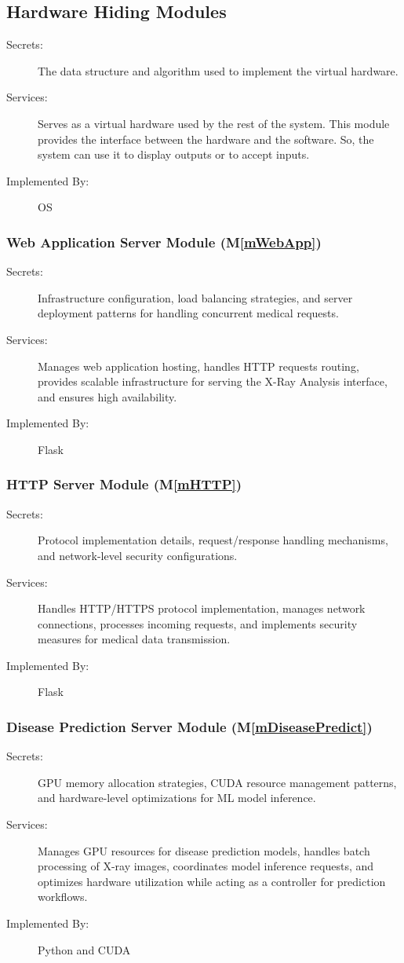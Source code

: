\documentclass[12pt, titlepage]{article}
\newcommand{\mref}[1]{M\ref{#1}}
\begin{document}
\subsection{Hardware Hiding Modules}

\begin{description}
\item[Secrets:]The data structure and algorithm used to implement the virtual
  hardware.
\item[Services:]Serves as a virtual hardware used by the rest of the
  system. This module provides the interface between the hardware and the
  software. So, the system can use it to display outputs or to accept inputs.
\item[Implemented By:] OS
\end{description}
\subsubsection{Web Application Server Module (\mref{mWebApp})}
\begin{description}
\item[Secrets:] Infrastructure configuration, load balancing strategies, and server deployment patterns for handling concurrent medical requests.
\item[Services:] Manages web application hosting, handles HTTP requests routing, provides scalable infrastructure for serving the X-Ray Analysis interface, and ensures high availability.
\item[Implemented By:] Flask
\end{description}
\subsubsection{HTTP Server Module (\mref{mHTTP})}
\begin{description}
\item[Secrets:] Protocol implementation details, request/response handling mechanisms, and network-level security configurations.
\item[Services:] Handles HTTP/HTTPS protocol implementation, manages network connections, processes incoming requests, and implements security measures for medical data transmission.
\item[Implemented By:] Flask
\end{description}
\subsubsection{Disease Prediction Server Module (\mref{mDiseasePredict})}
\begin{description}
\item[Secrets:] GPU memory allocation strategies, CUDA resource management patterns, and hardware-level optimizations for ML model inference.
\item[Services:] Manages GPU resources for disease prediction models, handles batch processing of X-ray images, coordinates model inference requests, and optimizes hardware utilization while acting as a controller for prediction workflows.
\item[Implemented By:] Python and CUDA
\end{description}
\end{document}
